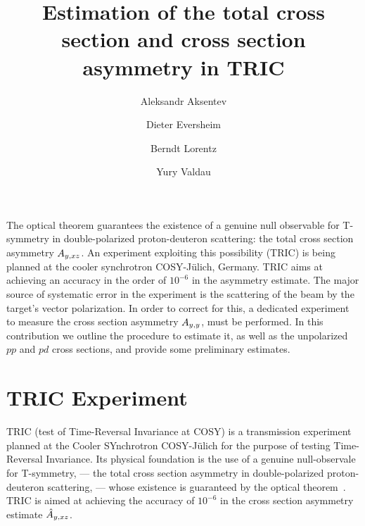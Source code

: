 \documentclass[reprint, superscriptaddress]{revtex4-1}
\begin{document}
\title{Estimation of the total cross section and cross section asymmetry in TRIC}
\author{Aleksandr Aksentev}
\author{Dieter Eversheim}
\author{Berndt Lorentz}
\author{Yury Valdau}

\maketitle

\captionsetup[figure]{labelfont=bf,textfont=normalfont,singlelinecheck=off,justification=raggedright}

	
	
\begin{abstractname}
	The optical theorem guarantees the existence of a genuine null observable for T-symmetry in double-polarized proton-deuteron scattering: the total cross section asymmetry $\Ayxz$. An experiment exploiting this possibility (TRIC) is being planned at the cooler synchrotron COSY-J\"ulich, Germany. TRIC aims at achieving an accuracy in the order of $10^{-6}$ in the asymmetry estimate. The major source of systematic error in the experiment is the scattering of the beam by the target's vector polarization. In order to correct for this, a dedicated experiment to measure the cross section asymmetry $\Ayy$, must be performed. In this contribution we outline the procedure to estimate it, as well as the unpolarized $pp$ and $pd$ cross sections, and provide some preliminary estimates.
\end{abstractname}

\section{TRIC Experiment}

TRIC (test of Time-Reversal Invariance at COSY) is a transmission experiment planned at the Cooler SYnchrotron COSY-J\"ulich for the purpose of testing Time-Reversal Invariance. Its physical foundation is the use of a genuine null-observale for T-symmetry, --- the total cross section asymmetry in double-polarized proton-deuteron scattering, --- whose existence is guaranteed by the optical theorem~\cite{Conzett}. TRIC is aimed at achieving the accuracy of $10^{-6}$ in the cross section asymmetry estimate $\Ayxz*$.
\end{document}

